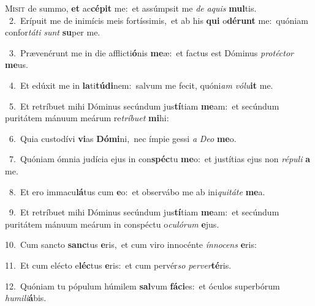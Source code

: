 \lettrine{\initial\textcolor{\initialcolor}{M}}{isit} de summo, \textbf{et} ac\-\textbf{cé}\-\textbf{pit} me:~\star et assúmpsit me \textit{de} \textit{a}\-\textit{quis} \textbf{mul}\-tis.\\
{\numbfont\textcolor{\numbcolor}{~2.}}~Erípuit me de inimícis meis fortíssimis,~\dagger et ab his \textbf{qui} o\-\textbf{dé}\-\textbf{runt} me:~\star quóniam confor\-\textit{tá}\-\textit{ti} \textit{sunt} \textbf{su}\-per me.\par
{\numbfont\textcolor{\numbcolor}{~3.}}~Prævenérunt me in die afflicti\-\textbf{ó}\-nis \textbf{me}\-æ:~\star et factus est Dóminus \textit{pro}\-\textit{téc}\textit{tor} \textbf{me}\-us.\par
{\numbfont\textcolor{\numbcolor}{~4.}}~Et edúxit me in \textbf{la}\-ti\-\textbf{tú}\-\textbf{di}nem:~\star salvum me fecit, quóni\textit{am} \textit{vó}\-\textit{lu}\textbf{it} me.\par
{\numbfont\textcolor{\numbcolor}{~5.}}~Et retríbuet mihi Dóminus secúndum jus\-\textbf{tí}\-tiam \textbf{me}\-am:~\star et secúndum puritátem mánuum meárum re\-\textit{trí}\-\textit{bu}\textit{et} \textbf{mi}\-hi:\par
{\numbfont\textcolor{\numbcolor}{~6.}}~Quia custodívi \textbf{vi}\-as \textbf{Dó}\-\textbf{mi}ni,~\star nec ímpie gessi \textit{a} \textit{De}\-\textit{o} \textbf{me}\-o.\par
{\numbfont\textcolor{\numbcolor}{~7.}}~Quóniam ómnia judícia ejus in con\-\textbf{spéc}\-tu \textbf{me}\-o:~\star et justítias ejus non \textit{ré}\-\textit{pu}\textit{li} \textbf{a} me.\par
{\numbfont\textcolor{\numbcolor}{~8.}}~Et ero immacu\-\textbf{lá}\-tus cum \textbf{e}\-o:~\star et observábo me ab ini\-\textit{qui}\-\textit{tá}\textit{te} \textbf{me}\-a.\par
{\numbfont\textcolor{\numbcolor}{~9.}}~Et retríbuet mihi Dóminus secúndum jus\-\textbf{tí}\-tiam \textbf{me}\-am:~\star et secúndum puritátem mánuum meárum in conspéctu o\-\textit{cu}\-\textit{ló}\textit{rum} \textbf{e}\-jus.\par
{\numbfont\textcolor{\numbcolor}{10.}}~Cum sancto \textbf{sanc}\-tus \textbf{e}\-ris,~\star et cum viro innocénte \textit{ín}\-\textit{no}\textit{cens} \textbf{e}\-ris:\par
{\numbfont\textcolor{\numbcolor}{11.}}~Et cum elécto e\-\textbf{léc}\-tus \textbf{e}\-ris:~\star et cum pervér\textit{so} \textit{per}\-\textit{ver}\textbf{té}ris.\par
{\numbfont\textcolor{\numbcolor}{12.}}~Quóniam tu pópulum húmilem \textbf{sal}\-vum \textbf{fá}\-\textbf{ci}es:~\star et óculos superbórum \textit{hu}\-\textit{mi}\textit{li}\textbf{á}bis.\par

